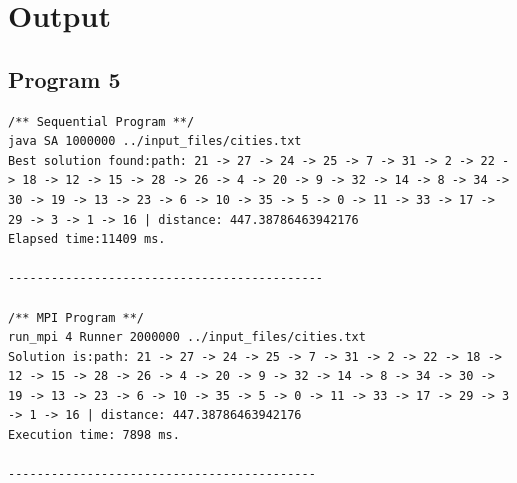 \documentclass{article}
\begin{document}
	
	\section{Output} \label{OUT}
	
		\subsection{Program 5} \label{P5_OUT}		
			\begin{lstlisting}
/** Sequential Program **/
java SA 1000000 ../input_files/cities.txt
Best solution found:path: 21 -> 27 -> 24 -> 25 -> 7 -> 31 -> 2 -> 22 -> 18 -> 12 -> 15 -> 28 -> 26 -> 4 -> 20 -> 9 -> 32 -> 14 -> 8 -> 34 -> 30 -> 19 -> 13 -> 23 -> 6 -> 10 -> 35 -> 5 -> 0 -> 11 -> 33 -> 17 -> 29 -> 3 -> 1 -> 16 | distance: 447.38786463942176
Elapsed time:11409 ms.

--------------------------------------------

/** MPI Program **/
run_mpi 4 Runner 2000000 ../input_files/cities.txt
Solution is:path: 21 -> 27 -> 24 -> 25 -> 7 -> 31 -> 2 -> 22 -> 18 -> 12 -> 15 -> 28 -> 26 -> 4 -> 20 -> 9 -> 32 -> 14 -> 8 -> 34 -> 30 -> 19 -> 13 -> 23 -> 6 -> 10 -> 35 -> 5 -> 0 -> 11 -> 33 -> 17 -> 29 -> 3 -> 1 -> 16 | distance: 447.38786463942176
Execution time: 7898 ms.

-------------------------------------------


\end{lstlisting}
\end{document}

